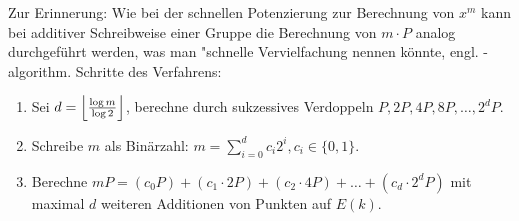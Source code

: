\begin{bem}
	Zur Erinnerung: Wie bei der schnellen Potenzierung zur Berechnung von $x^m$ kann bei additiver Schreibweise einer Gruppe die Berechnung von $m \cdot P$ analog durchgeführt werden, was man "schnelle Vervielfachung nennen könnte, engl. -algorithm.
	Schritte des Verfahrens:
	\begin{enumerate}[1)]
		\item Sei $d = \floor*{\frac{\log m}{\log 2}}$, berechne durch sukzessives Verdoppeln $P, 2P, 4P, 8P, \dots, 2^d P$.
		\item Schreibe $m$ als Binärzahl: $m = \sum_{i=0}^d c_i 2^i, c_i \in \{0,1\}$.
		\item Berechne $mP = (c_0 P) + (c_1 \cdot 2P) + (c_2 \cdot 4P) + \dots + (c_d \cdot 2^dP)$ mit maximal $d$ weiteren Additionen von Punkten auf $E(k)$.
	\end{enumerate}
\end{bem}